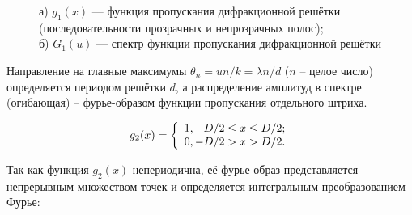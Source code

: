 \documentclass[a5paper,10pt, twoside]{article} %
\begin{document}
	\begin{figure}[h]\label{ris:dr}
		\begin{minipage}[h]{0.49\linewidth}
		\end{minipage}
		\hfill
		\begin{minipage}[h]{0.49\linewidth}
		\end{minipage}
		\caption
		{
			а) $g_1 (x)$ — функция пропускания дифракционной решётки (последовательности 
							прозрачных и непрозрачных полос); \\
			б) $G_1 (u)$ — спектр функции пропускания дифракционной решётки
		}
	\end{figure}
	
	Направление на главные максимумы $\theta_n = un / k = \lambda n / d$ ($n$ -- целое число) 
	определяется периодом решётки $d$, а распределение амплитуд в спектре (огибающая) -- 
	фурье-образом функции пропускания отдельного штриха.
	
	\begin{equation}
		g_2(x) = 
		\left\lbrace\begin{array}{c} 
			1, -D / 2 \le x \le D / 2; \\ 
			0, -D / 2 > x > D / 2.
		 \end{array} \right.
	\end{equation}
	
	Так	как функция	$g_2(x)$ непериодична, её фурье-образ представляется непрерывным множеством 
	точек и определяется интегральным преобразованием Фурье:
	
\end{document}
